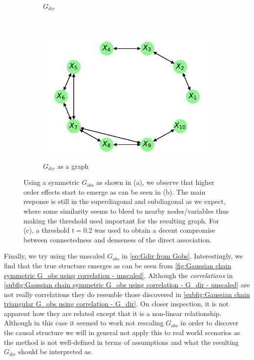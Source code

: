 \documentclass[../Thesis.tex]{subfiles}
\begin{document}
\begin{figure}[H]
\begin{subfigure}[t]{0.49\textwidth}
        \caption{$G_{dir}$}
        \label{subfig:Gaussian chain symmetric G_obs using correlation - G_dir}
    \end{subfigure}
    \\[\baselineskip]
    \begin{subfigure}[t]{0.49\textwidth}
        \centering
        \includegraphics[width=.9\linewidth]{figures/Gaussian Chain Theoretical/Chain graph from symmetric G obs.pdf}
        \caption{$G_{dir}$ as a graph}
    \end{subfigure}
    \caption{Using a symmetric $G_{obs}$ as shown in (a), we observe that higher order effects start to emerge as can be seen in (b). The main response is still in the superdiagonal and subdiagonal as we expect, where some similarity seems to bleed to nearby nodes/variables thus making the threshold used important for the resulting graph. For (c), a threshold $t=0.2$ was used to obtain a decent compromise between connectedness and denseness of the direct association.}
    \label{fig:Gaussian chain symmetric G_obs using correlation}
\end{figure}
Finally, we try using the unscaled $G_{obs}$ in \autoref{eq:Gdir from Gobs}. Interestingly, we find that the true structure emerges as can be seen from \autoref{fig:Gaussian chain symmetric G_obs using correlation - unscaled}. Although the \textit{correlations} in \autoref{subfig:Gaussian chain symmetric G_obs using correlation - G_dir - unscaled} are not really correlations they do resemble those discovered in \autoref{subfig:Gaussian chain triangular G_obs using correlation - G_dir}. On closer inspection, it is not apparent how they are related except that it is a non-linear relationship. Although in this case it seemed to work not rescaling $G_{obs}$ in order to discover the causal structure we will in general not apply this to real world scenarios as the method is not well-defined in terms of assumptions and what the resulting $G_{dir}$ should be interpreted as.
\end{document}
